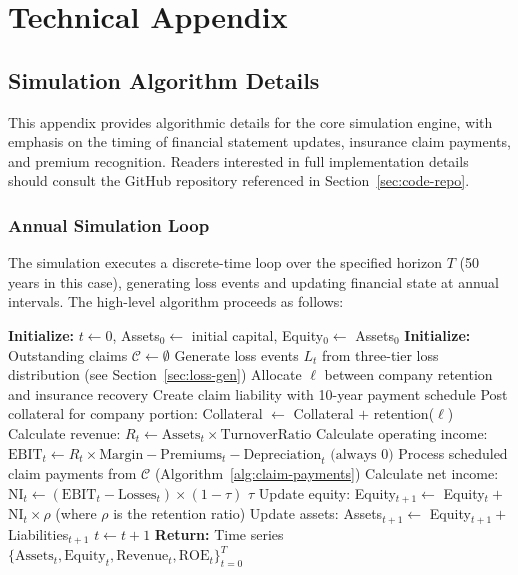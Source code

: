 \documentclass[11pt,letterpaper]{article}
\begin{document}
% 



\pagebreak

\appendix
\section{Technical Appendix}

\subsection{Simulation Algorithm Details}

This appendix provides algorithmic details for the core simulation engine, with emphasis on the timing of financial statement updates, insurance claim payments, and premium recognition. Readers interested in full implementation details should consult the GitHub repository referenced in Section~\ref{sec:code-repo}.

\subsubsection{Annual Simulation Loop}

The simulation executes a discrete-time loop over the specified horizon $T$ (50 years in this case), generating loss events and updating financial state at annual intervals. The high-level algorithm proceeds as follows:

\begin{algorithmic}[1]
\State \textbf{Initialize:} $t \gets 0$, Assets$_0 \gets$ initial capital, Equity$_0 \gets$ Assets$_0$
\State \textbf{Initialize:} Outstanding claims $\mathcal{C} \gets \emptyset$
    \State Generate loss events $L_t$ from three-tier loss distribution (see Section~\ref{sec:loss-gen})
        \State Allocate $\ell$ between company retention and insurance recovery
        \State Create claim liability with 10-year payment schedule
        \State Post collateral for company portion: Collateral $\gets$ Collateral $+$ retention($\ell$)
    \EndFor
    \State Calculate revenue: $R_t \gets \text{Assets}_t \times \text{TurnoverRatio}$
    \State Calculate operating income: $\text{EBIT}_t \gets R_t \times \text{Margin} - \text{Premiums}_t - \text{Depreciation}_t \text{ (always 0)}$
    \State Process scheduled claim payments from $\mathcal{C}$ (Algorithm~\ref{alg:claim-payments})
    \State Calculate net income: $\text{NI}_t \gets (\text{EBIT}_t - \text{Losses}_t) \times (1 - \tau)$  $\tau$ 
    \State Update equity: Equity$_{t+1} \gets$ Equity$_t +$ NI$_t \times \rho$ (where $\rho$ is the retention ratio)
    \State Update assets: Assets$_{t+1} \gets$ Equity$_{t+1} +$ Liabilities$_{t+1}$
    \State $t \gets t + 1$
\EndWhile
\State \textbf{Return:} Time series $\{\text{Assets}_t, \text{Equity}_t, \text{Revenue}_t, \text{ROE}_t\}_{t=0}^{T}$
\end{algorithmic}
\end{document}
